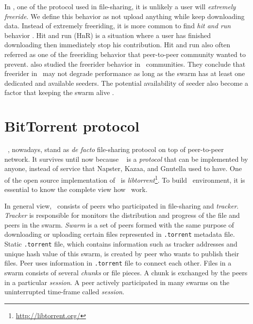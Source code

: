 In \bt, one of the protocol used in file-sharing, it is unlikely a user will \textit{extremely freeride}. We define this behavior as not upload anything while keep downloading data. Instead of extremely freeriding, it is more common to find \textit{hit and run} behavior \cite{2011:managesupplydemand:meulpolder}. Hit and run (HnR) is a situation where a user has finished downloading then immediately stop his contribution. Hit and run also often referred as one of the freeriding behavior that peer-to-peer community wanted to prevent. \citeauthor{2015:freeriderinbtcommunity:das} also studied the freerider behavior in \bt~communities. They conclude that freerider in \bt~may not degrade performance as long as the swarm has at least one dedicated and available seeders. The potential availability of seeder also become a factor that keeping the swarm alive \cite{2015:freeriderinbtcommunity:das}. 

\section{BitTorrent protocol}
\bt~\cite{2003:bittorrent:cohen}, nowadays, stand as \textit{de facto} file-sharing protocol on top of peer-to-peer network. It survives until now because \bt~ is a \textit{protocol} that can be implemented by anyone, instead of service that Napster, Kazaa, and Gnutella used to have. One of the open source implementation of \bt~is \textit{libtorrent}\footnote{\url{http://libtorrent.org/}}. To build \bt~environment, it is essential to know the complete view how \bt~work. 

In general view, \bt~consists of peers who participated in file-sharing and \textit{tracker}. \textit{Tracker} is responsible for monitors the distribution and progress of the file and peers in the swarm. \textit{Swarm} is a set of peers formed with the same purpose of downloading or uploading certain files represented in \texttt{.torrent} metadata file. Static \texttt{.torrent} file, which contains information such as tracker addresses and unique hash value of this swarm, is created by peer who wants to publish their files. Peer uses information in \texttt{.torrent} file to connect each other. Files in a swarm consists of several \textit{chunks} or file pieces. A chunk is exchanged by the peers in a particular \textit{session}. A peer actively participated in many swarms on the uninterrupted time-frame called \textit{session}.

